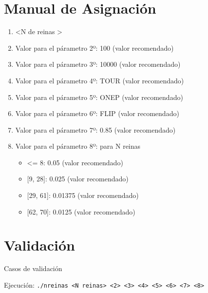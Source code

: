 \documentclass[12pt]{article}
\begin{document}
    \section{Manual de Asignación}

    \begin{enumerate}
    \item \textless N de reinas \textgreater
    \item Valor para el párametro 2º: 100 (valor recomendado)
    \item Valor para el párametro 3º: 10000 (valor recomendado)
    \item Valor para el párametro 4º: TOUR (valor recomendado)
    \item Valor para el párametro 5º: ONEP (valor recomendado)
    \item Valor para el párametro 6º: FLIP (valor recomendado)
    \item Valor para el párametro 7º: 0.85 (valor recomendado)
    \item Valor para el párametro 8º: para N reinas
        \begin{itemize}
           \item \textless= 8: 0.05 (valor recomendado)
           \item {[9, 28]}: 0.025 (valor recomendado)
           \item {[29, 61]}: 0.01375 (valor recomendado)
           \item {[62, 70]}: 0.0125 (valor recomendado)
       \end{itemize}
    \end{enumerate}

    \section{Validación}

    Casos de validación

    Ejecución: \texttt{./nreinas <N reinas> <2> <3> <4> <5> <6> <7> <8>}
\end{document}
